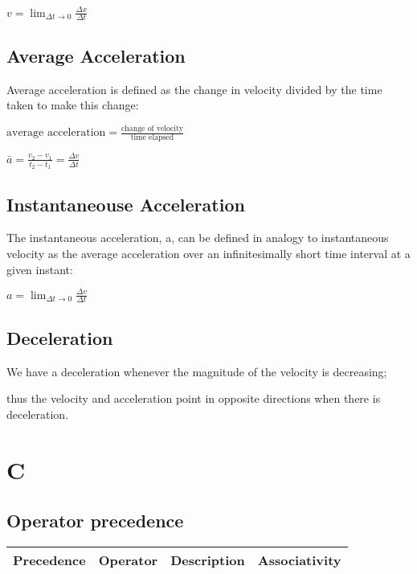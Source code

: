 \documentclass{extarticle}
\begin{document}
\begin{multicols}{4}
$v = \lim_{\Delta t \to 0} \frac{\Delta x}{\Delta t}$

\subsection{Average Acceleration}
Average acceleration is defined as the change in velocity divided by the time taken to make this change:

$\text{average acceleration} = \frac{\text{change of velocity}}{\text{time elapsed}}$

$\bar{a} = \frac{v_2 - v_1}{t_2 - t_1} = \frac{\Delta v}{\Delta t}$

\subsection{Instantaneouse Acceleration}
The instantaneous acceleration, a, can be defined in analogy to instantaneous
velocity as the average acceleration over an infinitesimally short time interval at
a given instant:

$a = \lim_{\Delta t \to 0} \frac{\Delta v}{\Delta t}$


\subsection{Deceleration}
We have a deceleration whenever the magnitude of the velocity is decreasing;

thus the velocity and acceleration point in opposite directions when there is deceleration.


















\section{C}

\subsection{Operator precedence}

\begin{tabular}{|l|l|l|l|}
\hline
Precedence     & Operator                                              & Description                                                            & Associativity \\ \hline
\end{tabular}



\end{multicols}
\end{document}
